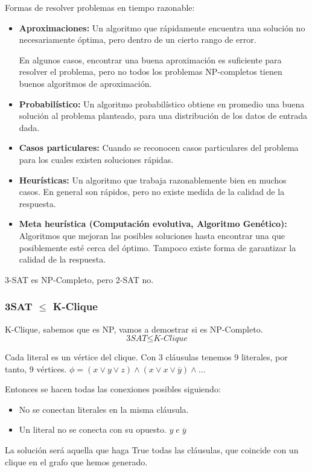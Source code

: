Formas de resolver problemas en tiempo razonable:
\begin{itemize}
	\item \textbf{Aproximaciones:} Un algoritmo que rápidamente encuentra una solución no necesariamente óptima, pero dentro de un cierto rango de error.

	      En algunos casos, encontrar una buena aproximación es suficiente para resolver el problema, pero no todos los problemas NP-completos tienen buenos algoritmos de aproximación.
	\item \textbf{Probabilístico:} Un algoritmo probabilístico obtiene en promedio una buena solución al problema planteado, para una distribución de los datos de entrada dada.
	\item \textbf{Casos particulares:} Cuando se reconocen casos particulares del problema para los cuales existen soluciones rápidas.
	\item \textbf{Heurísticas:} Un algoritmo que trabaja razonablemente bien en muchos casos. En general son rápidos, pero no existe medida de la calidad de la respuesta.
	\item \textbf{Meta heurística (Computación evolutiva, Algoritmo Genético):} Algoritmos que mejoran las posibles soluciones hasta encontrar una que posiblemente esté cerca del óptimo. Tampoco existe forma de garantizar la calidad de la respuesta.
\end{itemize}

3-SAT es NP-Completo, pero 2-SAT no.

\subsubsection{3SAT $\leq$ K-Clique}
K-Clique, sabemos que es NP, vamos a demostrar si es NP-Completo.
$$\textit{3SAT} \leq \textit{K-Clique}$$

Cada literal es un vértice del clique. Con 3 cláusulas tenemos 9 literales, por tanto, 9 vértices. $\phi=(x\vee y \vee z) \wedge (x\vee x \vee \overline{y}) \wedge \dots$

Entonces se hacen todas las conexiones posibles siguiendo:
\begin{itemize}
	\item No se conectan literales en la misma cláusula.
	\item Un literal no se conecta con su opuesto. $y \; e\; \overline{y}$
\end{itemize}

La solución será aquella que haga True todas las cláusulas, que coincide con un clique en el grafo que hemos generado.

